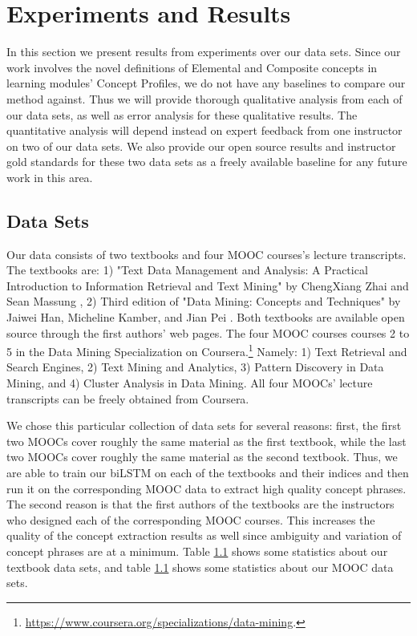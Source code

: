 \section{Experiments and Results}
In this section we present results from experiments over our data sets. Since our work involves the novel definitions of Elemental and Composite concepts in learning modules' Concept Profiles, we do not have any baselines to compare our method against. Thus we will provide thorough qualitative analysis from each of our data sets, as well as error analysis for these qualitative results. The quantitative analysis will depend instead on expert feedback from one instructor on two of our data sets. We also provide our open source results and instructor gold standards for these two data sets as a freely available baseline for any future work in this area.

\subsection{Data Sets}
Our data consists of two textbooks and four MOOC courses's lecture transcripts. The textbooks are: 1) "Text Data Management and Analysis: A Practical Introduction to Information Retrieval and Text Mining" by ChengXiang Zhai and Sean Massung \cite{} , 2) Third edition of "Data Mining: Concepts and Techniques" by Jaiwei Han, Micheline Kamber, and Jian Pei \cite{}. Both textbooks are available open source through the first authors' web pages. The four MOOC courses courses 2 to 5 in the Data Mining Specialization on Coursera.\footnote{\url{https://www.coursera.org/specializations/data-mining}.} Namely: 1) Text Retrieval and Search Engines, 2) Text Mining and Analytics, 3) Pattern Discovery in Data Mining, and 4) Cluster Analysis in Data Mining. All four MOOCs' lecture transcripts can be freely obtained from Coursera.

We chose this particular collection of data sets for several reasons: first, the first two MOOCs cover roughly the same material as the first textbook, while the last two MOOCs cover roughly the same material as the second textbook. Thus, we are able to train our biLSTM on each of the textbooks and their indices and then run it on the corresponding MOOC data to extract high quality concept phrases. The second reason is that the first authors of the textbooks are the instructors who designed each of the corresponding MOOC courses. This increases the quality of the concept extraction results as well since ambiguity and variation of concept phrases are at a minimum. Table \ref{} shows some statistics about our textbook data sets, and table \ref{} shows some statistics about our MOOC data sets.

